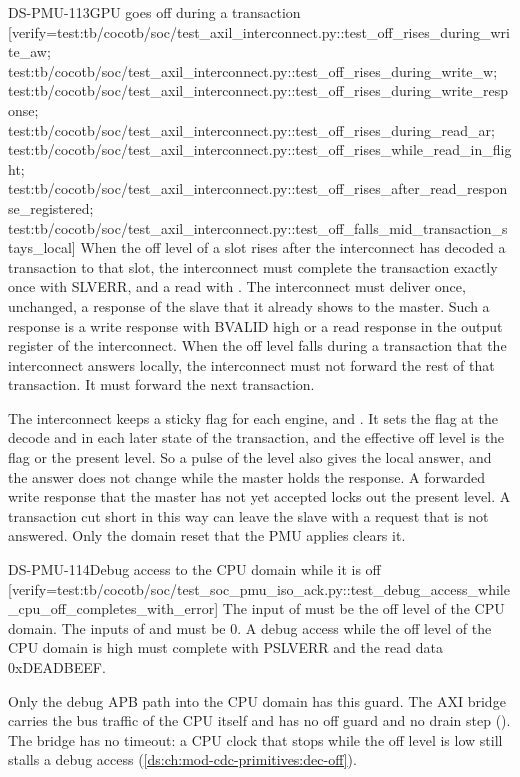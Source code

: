\begin{requirement}{DS-PMU-113}{GPU goes off during a transaction}
[verify={test:tb/cocotb/soc/test_axil_interconnect.py::test_off_rises_during_write_aw; test:tb/cocotb/soc/test_axil_interconnect.py::test_off_rises_during_write_w; test:tb/cocotb/soc/test_axil_interconnect.py::test_off_rises_during_write_response; test:tb/cocotb/soc/test_axil_interconnect.py::test_off_rises_during_read_ar; test:tb/cocotb/soc/test_axil_interconnect.py::test_off_rises_while_read_in_flight; test:tb/cocotb/soc/test_axil_interconnect.py::test_off_rises_after_read_response_registered; test:tb/cocotb/soc/test_axil_interconnect.py::test_off_falls_mid_transaction_stays_local}]
When the off level of a slot rises after the interconnect has decoded a transaction to that slot, the interconnect must complete the transaction exactly once with SLVERR, and a read with . The interconnect must deliver once, unchanged, a response of the slave that it already shows to the master. Such a response is a write response with BVALID high or a read response in the output register of the interconnect. When the off level falls during a transaction that the interconnect answers locally, the interconnect must not forward the rest of that transaction. It must forward the next transaction.
\end{requirement}
\begin{information}
The interconnect keeps a sticky flag for each engine,  and . It sets the flag at the decode and in each later state of the transaction, and the effective off level is the flag or the present level. So a pulse of the level also gives the local answer, and the answer does not change while the master holds the response. A forwarded write response that the master has not yet accepted locks out the present level. A transaction cut short in this way can leave the slave with a request that is not answered. Only the domain reset that the PMU applies clears it.
\end{information}

\begin{requirement}{DS-PMU-114}{Debug access to the CPU domain while it is off}
[verify={test:tb/cocotb/soc/test_soc_pmu_iso_ack.py::test_debug_access_while_cpu_off_completes_with_error}]
The input  of  must be the off level of the CPU domain. The inputs  of  and  must be 0. A debug access while the off level of the CPU domain is high must complete with PSLVERR and the read data 0xDEADBEEF.
\end{requirement}
\begin{information}
Only the debug APB path into the CPU domain has this guard. The AXI bridge  carries the bus traffic of the CPU itself and has no off guard and no drain step (). The bridge has no timeout: a CPU clock that stops while the off level is low still stalls a debug access (\cref{ds:ch:mod-cdc-primitives:dec-off}).
\end{information}

